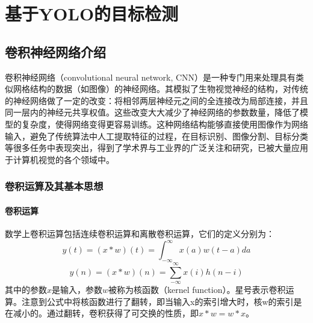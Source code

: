 
\chapter{基于YOLO的目标检测}

\section{卷积神经网络介绍}
卷积神经网络（convolutional neural network, CNN）\cite{lecun1989}是一种专门用来处理具有类似网格结构的数据（如图像）的神经网络\cite{Goodfellow-et-al-2016}。其模拟了生物视觉神经的结构，对传统的神经网络做了一定的改变：将相邻两层神经元之间的全连接改为局部连接，并且同一层内的神经元共享权值。这些改变大大减少了神经网络的参数数量，降低了模型的复杂度，使得网络变得更容易训练。这种网络结构能够直接使用图像作为网络输入，避免了传统算法中人工提取特征的过程，在目标识别、图像分割、目标分类等很多任务中表现突出，得到了学术界与工业界的广泛关注和研究，已被大量应用于计算机视觉的各个领域中。



\subsection{卷积运算及其基本思想}
\subsubsection{卷积运算}
数学上卷积运算包括连续卷积运算和离散卷积运算，它们的定义分别为：
%
\begin{equation}\label{eq:3_1_0}
y(t) = (x*w)(t) = \int_{-\infty}^{\infty}x(a)w(t-a)da
\end{equation}
\begin{equation}
y(n) = (x*w)(n) = \sum_{-\infty}^{\infty}x(i)h(n-i)
\end{equation}
其中的参数$x$是输入，参数$w$被称为核函数（kernel function）。星号表示卷积运算。注意到公式中将核函数进行了翻转，即当输入x的索引增大时，核w的索引是在减小的。通过翻转，卷积获得了可交换的性质，即$x*w=w*x$。

